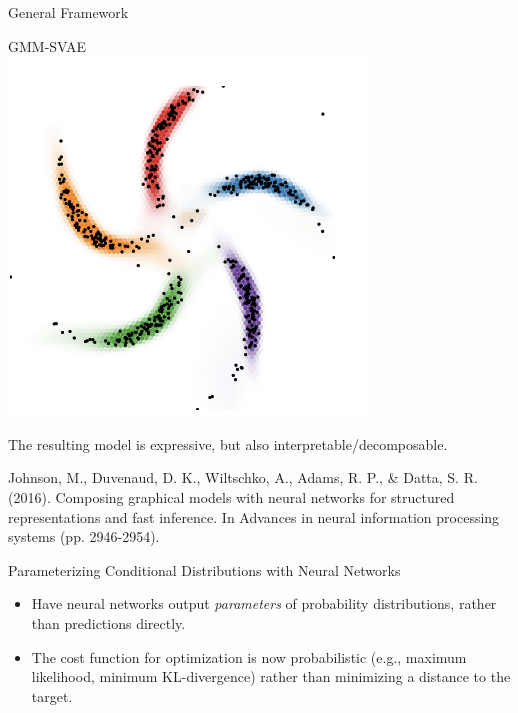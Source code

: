 \documentclass[10pt]{beamer}
\begin{document}
\begin{frame}{General Framework}
\begin{minipage}[t][.9\textheight]{\textwidth}
\begin{minipage}[t]{.3\textwidth}
  \begin{center}
  GMM-SVAE \\
  \includegraphics[width=.7\textwidth]{images/example_composed_gmm}
  \end{center}
 \end{minipage} 

\vspace{.2in}
\vfill
The resulting model is expressive, but also interpretable/decomposable.\\

\vfill 

\tiny Johnson, M., Duvenaud, D. K., Wiltschko, A., Adams, R. P., \& Datta, S. R. (2016). Composing graphical models with neural networks for structured representations and fast inference. In Advances in neural information processing systems (pp. 2946-2954).
\end{minipage}

\end{frame}


\begin{frame}{Parameterizing Conditional Distributions with Neural Networks}

\begin{itemize}
\item Have neural networks output \textit{parameters} of probability distributions, rather than predictions directly. \pause 
\item The cost function for optimization is now probabilistic (e.g., maximum likelihood, minimum KL-divergence) rather than minimizing a distance to the target.
\end{itemize}


\end{frame}
\end{document}
